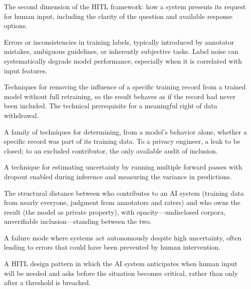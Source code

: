 \begin{description}[style=nextline, leftmargin=2em]
\item[Intervention Design]
The second dimension of the HITL framework: how a system presents its request for human input, including the clarity of the question and available response options.

\item[Label Noise]
Errors or inconsistencies in training labels, typically introduced by annotator mistakes, ambiguous guidelines, or inherently subjective tasks. Label noise can systematically degrade model performance, especially when it is correlated with input features.

\item[Machine Unlearning]
Techniques for removing the influence of a specific training record from a trained model without full retraining, so the result behaves as if the record had never been included. The technical prerequisite for a meaningful right of data withdrawal.

\item[Membership Inference]
A family of techniques for determining, from a model's behavior alone, whether a specific record was part of its training data. To a privacy engineer, a leak to be closed; to an excluded contributor, the only available audit of inclusion.

\item[Monte Carlo Dropout]
A technique for estimating uncertainty by running multiple forward passes with dropout enabled during inference and measuring the variance in predictions.

\item[Ownership Gap]
The structural distance between who contributes to an AI system (training data from nearly everyone, judgment from annotators and raters) and who owns the result (the model as private property), with opacity---undisclosed corpora, unverifiable inclusion---standing between the two.

\item[Overconfidence]
A failure mode where systems act autonomously despite high uncertainty, often leading to errors that could have been prevented by human intervention.

\item[Proactive Assistance]
A HITL design pattern in which the AI system anticipates when human input will be needed and asks before the situation becomes critical, rather than only after a threshold is breached.


\end{description}
